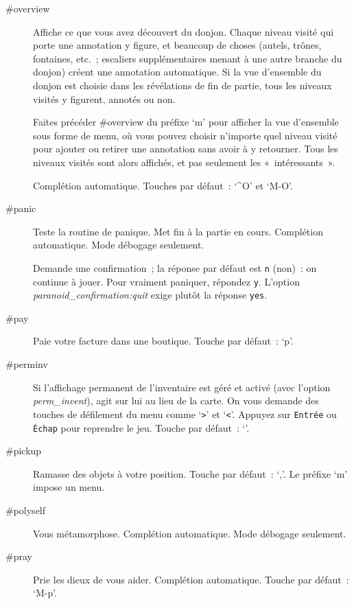\documentclass[titlepage]{article}
\begin{document}
\begin{description}
\item[{\#overview}]
Affiche ce que vous avez découvert du donjon.
Chaque niveau visité
qui porte une annotation y figure, et beaucoup de choses (autels, trônes,
fontaines, etc.~; escaliers supplémentaires menant à une autre branche du
donjon) créent une annotation automatique.
Si la vue d'ensemble du donjon est choisie dans les révélations de fin de
partie, tous les niveaux visités y figurent, annotés ou non.


Faites précéder \#overview du préfixe `m' pour afficher la vue
d'ensemble sous forme de menu, où vous pouvez choisir n'importe quel
niveau visité pour ajouter ou retirer une annotation sans avoir à y
retourner.
Tous les niveaux visités sont alors affichés, et pas seulement les
«~intéressants~».


Complétion automatique.
Touches par défaut~: `\textasciicircum{}O' et `M-O'.

\item[{\#panic}]
Teste la routine de panique.
Met fin à la partie en cours.
Complétion automatique.
Mode débogage seulement.


Demande une confirmation~; la réponse par défaut est \texttt{n} (non)~: on
continue à jouer.
Pour vraiment paniquer, répondez \texttt{y}.
L'option
\textit{paranoid\_confirmation:quit}
exige plutôt la réponse \texttt{yes}.

\item[{\#pay}]
Paie votre facture dans une boutique.
Touche par défaut~: `p'.

\item[{\#perminv}]
Si l'affichage permanent de l'inventaire est géré et activé (avec l'option
\textit{perm\_invent}),
agit sur lui au lieu de la carte.
On vous demande des touches de défilement du menu comme `\texttt{\textgreater{}}'
et `\texttt{\textless{}}'.
Appuyez sur \texttt{Entrée} ou \texttt{Échap} pour reprendre le jeu.
Touche par défaut~: `\textbar{}'.

\item[{\#pickup}]
Ramasse des objets à votre position.
Touche par défaut~: `,'.
Le préfixe `m' impose un menu.

\item[{\#polyself}]
Vous métamorphose.
Complétion automatique.
Mode débogage seulement.

\item[{\#pray}]
Prie les dieux de vous aider.
Complétion automatique.
Touche par défaut~: `M-p'.



\end{description}
\end{document}
